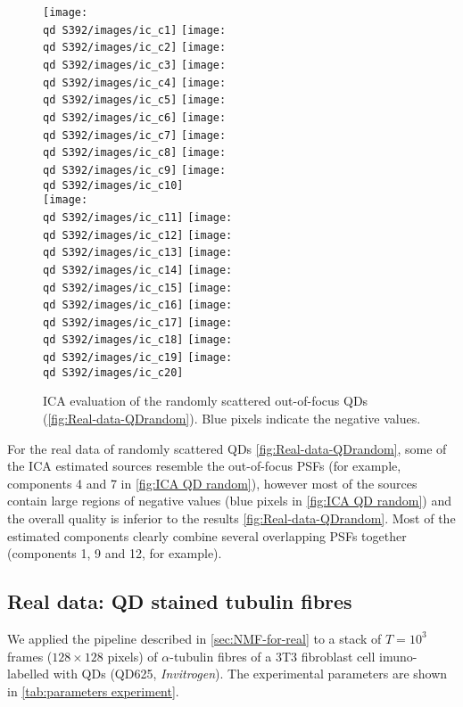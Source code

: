 \begin{figure}[htb]
	\newcommand{\wf}{.25}
	\newcommand{\barspace}{-.6cm}	
	\centering
	\texttt{[image: \\qd S392/images/ic\_c1]}
	\texttt{[image: \\qd S392/images/ic\_c2]}
	\texttt{[image: \\qd S392/images/ic\_c3]}
	\texttt{[image: \\qd S392/images/ic\_c4]}
	\texttt{[image: \\qd S392/images/ic\_c5]}
	\texttt{[image: \\qd S392/images/ic\_c6]}
	\texttt{[image: \\qd S392/images/ic\_c7]}
	\texttt{[image: \\qd S392/images/ic\_c8]}
	\texttt{[image: \\qd S392/images/ic\_c9]}
	\texttt{[image: \\qd S392/images/ic\_c10]}\\
	\texttt{[image: \\qd S392/images/ic\_c11]}
	\texttt{[image: \\qd S392/images/ic\_c12]}
	\texttt{[image: \\qd S392/images/ic\_c13]}
	\texttt{[image: \\qd S392/images/ic\_c14]}
	\texttt{[image: \\qd S392/images/ic\_c15]}
	\texttt{[image: \\qd S392/images/ic\_c16]}
	\texttt{[image: \\qd S392/images/ic\_c17]}
	\texttt{[image: \\qd S392/images/ic\_c18]}
	\texttt{[image: \\qd S392/images/ic\_c19]}
	\texttt{[image: \\qd S392/images/ic\_c20]}
	\caption{ICA evaluation of the randomly scattered out-of-focus QDs (\autoref{fig:Real-data-QDrandom}). Blue pixels indicate the negative values.}
	\label{fig:ICA QD random}
\end{figure}
%
For the real data of randomly scattered QDs \autoref{fig:Real-data-QDrandom}\aaa, some of the ICA estimated sources resemble the out-of-focus PSFs (for example, components 4 and 7 in \autoref{fig:ICA QD random}), however most of the sources contain large regions of negative values (blue pixels in \autoref{fig:ICA QD random}) and the overall quality is inferior to the \inmf{} results \autoref{fig:Real-data-QDrandom}\bbb. Most of the estimated components clearly combine several overlapping PSFs together (components 1, 9 and 12, for example). 
\clearpage
\subsection{Real data: QD stained tubulin fibres\label{sub:results - tubulin}}
We applied the pipeline described in \autoref{sec:NMF-for-real} to a stack of $T=10^3$ frames ($128\times128$ pixels) of $\alpha$-tubulin fibres of a 3T3 fibroblast cell imuno-labelled with QDs (QD625, \emph{Invitrogen}). The experimental parameters are shown in \autoref{tab:parameters experiment}.

